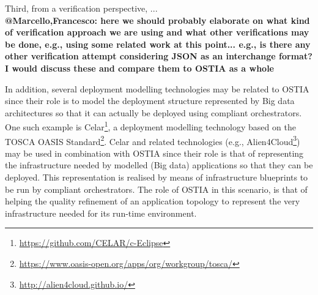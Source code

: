 Third, from a verification perspective, ...\\
\textbf{@Marcello,Francesco: here we should probably elaborate on what kind of verification approach we are using and what other verifications may be done, e.g., using some related work at this point... e.g., is there any other verification attempt considering JSON as an interchange format? I would discuss these and compare them to OSTIA as a whole}

In addition, several deployment modelling technologies may be related to OSTIA since their role is to model the deployment structure represented by Big data architectures so that it can actually be deployed using compliant orchestrators. One such example is Celar\footnote{\url{https://github.com/CELAR/c-Eclipse}}, a deployment modelling technology based on the TOSCA OASIS Standard\footnote{\url{https://www.oasis-open.org/apps/org/workgroup/tosca/}}. Celar and related technologies (e.g., Alien4Cloud\footnote{\url{http://alien4cloud.github.io/}}) may be used in combination with OSTIA since their role is that of representing the infrastructure needed by modelled (Big data) applications so that they can be deployed. This representation is realised by means of infrastructure blueprints to be run by compliant orchestrators. The role of OSTIA in this scenario, is that of helping the quality refinement of an application topology to represent the very infrastructure needed for its run-time environment.

